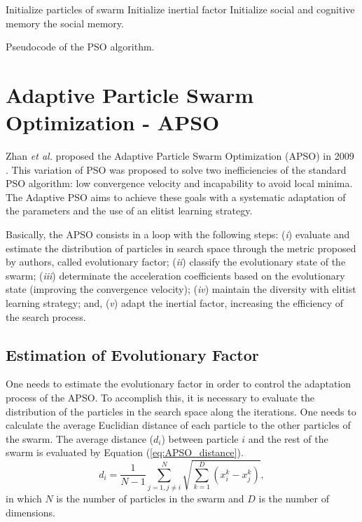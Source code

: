 \begin{algorithm}[!h]
    Initialize particles of swarm\;
    Initialize inertial factor\;
    Initialize social and cognitive memory\;
    \Return the social memory.
    \caption{Pseudocode of the PSO algorithm.}
    \label{alg:PSO}
\end{algorithm}

\section{Adaptive Particle Swarm Optimization - APSO}\label{sec:APSO}
Zhan \emph{et al.} proposed the Adaptive Particle Swarm Optimization (APSO) in 2009 \cite{APSO:Zhan2009}. This variation of PSO was proposed to solve two inefficiencies of the standard PSO algorithm: low convergence velocity and incapability to avoid local minima. The Adaptive PSO aims to achieve these goals with a systematic adaptation of the parameters and the use of an elitist learning strategy.

Basically, the APSO consists in a loop with the following steps: (\emph{i}) evaluate and estimate the distribution of particles in search space through the metric proposed by authors, called evolutionary factor; (\emph{ii}) classify the evolutionary state of the swarm; (\emph{iii}) determinate the acceleration coefficients based on the evolutionary state (improving the convergence velocity); (\emph{iv}) maintain the diversity with elitist learning strategy; and, (\emph{v}) adapt the inertial factor, increasing the efficiency of the search process.

\subsection{Estimation of Evolutionary Factor}
One needs to estimate the evolutionary factor in order to control the adaptation process of the APSO. To accomplish this, it is necessary to evaluate the distribution of the particles in the search space along the iterations. One needs to calculate the average Euclidian distance of each particle to the other particles of the swarm. The average distance ($d_i$) between particle $i$ and the rest of the swarm is evaluated by Equation (\ref{eq:APSO_distance}).
\begin{equation}\label{eq:APSO_distance}
d_i = \frac{1}{N-1}\sum_{j=1,j\neq i}^{N}\sqrt{\sum_{k=1}^{D}(x_i^k - x_j^k)},
\end{equation}
in which $N$ is the number of particles in the swarm and $D$ is the number of dimensions.

